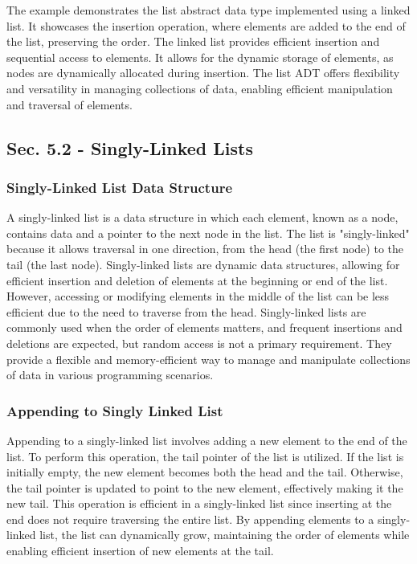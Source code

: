 \begin{solution}
    The example demonstrates the list abstract data type implemented using a linked list. It showcases the insertion operation, where elements are added to the end of the list, preserving the order. The linked list provides 
    efficient insertion and sequential access to elements. It allows for the dynamic storage of elements, as nodes are dynamically allocated during insertion. The list ADT offers flexibility and versatility in managing collections 
    of data, enabling efficient manipulation and traversal of elements.
\end{solution}

\subsection*{Sec. 5.2 - Singly-Linked Lists}

\subsubsection{Singly-Linked List Data Structure}

A singly-linked list is a data structure in which each element, known as a node, contains data and a pointer to the next node in the list. The list is "singly-linked" because it allows traversal in one direction, from the head (the first node) to the tail (the last node). 
Singly-linked lists are dynamic data structures, allowing for efficient insertion and deletion of elements at the beginning or end of the list. However, accessing or modifying elements in the middle of the list can be less efficient due to the need to traverse from the head. 
Singly-linked lists are commonly used when the order of elements matters, and frequent insertions and deletions are expected, but random access is not a primary requirement. They provide a flexible and memory-efficient way to manage and manipulate collections of data in various 
programming scenarios.

\subsubsection{Appending to Singly Linked List}

Appending to a singly-linked list involves adding a new element to the end of the list. To perform this operation, the tail pointer of the list is utilized. If the list is initially empty, the new element becomes both the head and the tail. Otherwise, the tail pointer is updated 
to point to the new element, effectively making it the new tail. This operation is efficient in a singly-linked list since inserting at the end does not require traversing the entire list. By appending elements to a singly-linked list, the list can dynamically grow, maintaining 
the order of elements while enabling efficient insertion of new elements at the tail.

